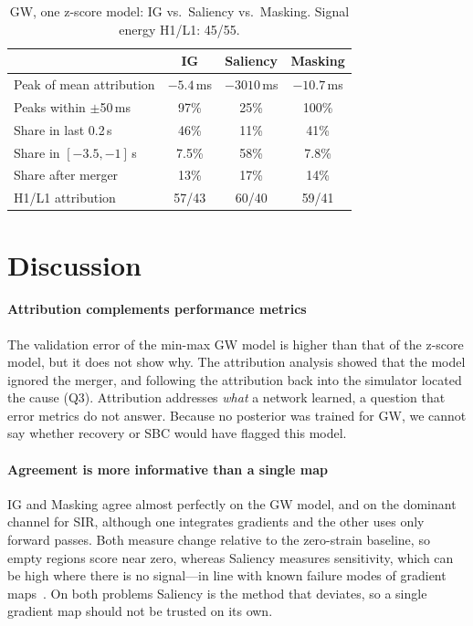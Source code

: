 \documentclass[conference]{IEEEtran}
\begin{document}
\begin{table}[!tb]
\centering
\caption{GW, one z-score model: IG vs.\ Saliency vs.\ Masking. Signal energy H1/L1: 45/55.}
\label{tab:gw-methods}
\footnotesize
\setlength{\tabcolsep}{3pt}
\begin{tabular}{@{}lccc@{}}
\toprule
 & IG & Saliency & Masking \\
\midrule
Peak of mean attribution & $-5.4$\,ms & \textcolor{warn}{$-3010$\,ms} & $-10.7$\,ms \\
Peaks within $\pm$50\,ms & 97\% & \textcolor{warn}{25\%} & 100\% \\
Share in last 0.2\,s & 46\% & \textcolor{warn}{11\%} & 41\% \\
Share in $[-3.5,-1]$\,s & 7.5\% & \textcolor{warn}{58\%} & 7.8\% \\
Share after merger & 13\% & 17\% & 14\% \\
H1/L1 attribution & 57/43 & 60/40 & 59/41 \\
\bottomrule
\end{tabular}
\end{table}

\section{Discussion}

\paragraph{Attribution complements performance metrics} The validation error of the min-max GW model is higher than
that of the z-score model, but it does not show why. The attribution analysis showed that the model ignored the
merger, and following the attribution back into the simulator located the cause (Q3). Attribution addresses
\emph{what} a network learned, a question that error metrics do not answer. Because no posterior was trained for
GW, we cannot say whether recovery or SBC would have flagged this model.

\paragraph{Agreement is more informative than a single map} IG and Masking agree almost perfectly on the GW
model, and on the dominant channel for SIR, although one integrates gradients and the other uses only forward
passes. Both measure change relative to
the zero-strain baseline, so empty regions score near zero, whereas Saliency measures sensitivity, which can be
high where there is no signal---in line with known failure modes of gradient
maps~\cite{adebayo2018sanity,kindermans2019unreliability}. On both problems Saliency is the method that deviates, so a
single gradient map should not be trusted on its own.
\end{document}
